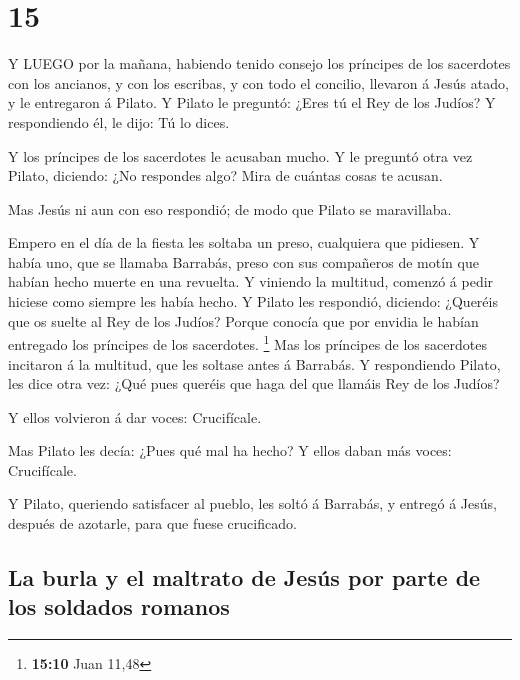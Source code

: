 \hypertarget{section-14}{%
\section{15}\label{section-14}}

 Y LUEGO por la mañana, habiendo tenido consejo los
príncipes de los sacerdotes con los ancianos, y con los escribas, y con
todo el concilio, llevaron á Jesús atado, y le entregaron á Pilato.
 Y Pilato le preguntó: ¿Eres tú el Rey de los Judíos? Y
respondiendo él, le dijo: Tú lo dices.

 Y los príncipes de los sacerdotes le acusaban mucho.
 Y le preguntó otra vez Pilato, diciendo: ¿No respondes
algo? Mira de cuántas cosas te acusan.

 Mas Jesús ni aun con eso respondió; de modo que Pilato se
maravillaba.

 Empero en el día de la fiesta les soltaba un preso,
cualquiera que pidiesen.  Y había uno, que se llamaba
Barrabás, preso con sus compañeros de motín que habían hecho muerte en
una revuelta.  Y viniendo la multitud, comenzó á pedir
hiciese como siempre les había hecho.  Y Pilato les
respondió, diciendo: ¿Queréis que os suelte al Rey de los Judíos?
 Porque conocía que por envidia le habían entregado los
príncipes de los sacerdotes. \footnote{\textbf{15:10} Juan 11,48}
 Mas los príncipes de los sacerdotes incitaron á la
multitud, que les soltase antes á Barrabás.  Y respondiendo
Pilato, les dice otra vez: ¿Qué pues queréis que haga del que llamáis
Rey de los Judíos?

 Y ellos volvieron á dar voces: Crucifícale.

 Mas Pilato les decía: ¿Pues qué mal ha hecho? Y ellos
daban más voces: Crucifícale.

 Y Pilato, queriendo satisfacer al pueblo, les soltó á
Barrabás, y entregó á Jesús, después de azotarle, para que fuese
crucificado.

\hypertarget{la-burla-y-el-maltrato-de-jesuxfas-por-parte-de-los-soldados-romanos}{%
\subsection{La burla y el maltrato de Jesús por parte de los soldados
romanos}\label{la-burla-y-el-maltrato-de-jesuxfas-por-parte-de-los-soldados-romanos}}

